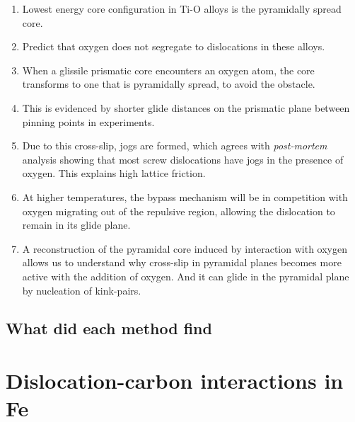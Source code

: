 \documentclass[a4paper,11pt]{article}
\numberwithin{equation}{chapter}
\numberwithin{listing}{chapter}
\begin{document}
\begin{enumerate}
\item Lowest energy core configuration in Ti-O alloys is the
pyramidally spread core.
\item Predict that oxygen does not segregate to dislocations in these
alloys.
\item When a glissile prismatic core encounters an oxygen atom, the
core transforms to one that is pyramidally spread, to avoid the
obstacle.
\item This is evidenced by shorter glide distances on the prismatic
plane between pinning points in experiments.
\item Due to this cross-slip, jogs are formed, which agrees with
\emph{post-mortem} analysis showing that most screw dislocations have
jogs in the presence of oxygen. This explains high lattice
friction.
\item At higher temperatures, the bypass mechanism will be in
competition with oxygen migrating out of the repulsive region,
allowing the dislocation to remain in its glide plane.
\item A reconstruction of the pyramidal core induced by interaction
with oxygen allows us to understand why cross-slip in pyramidal
planes becomes more active with the addition of oxygen. And it
can glide in the pyramidal plane by nucleation of kink-pairs.
\end{enumerate}








\subsection{What did each method find}
\label{sec:org6afe6b6}

\subsection{}
\label{sec:org2e6bec2}


\section{Dislocation-carbon interactions in Fe}
\label{sec:orgbc546f1}
\clearpage
\end{document}
